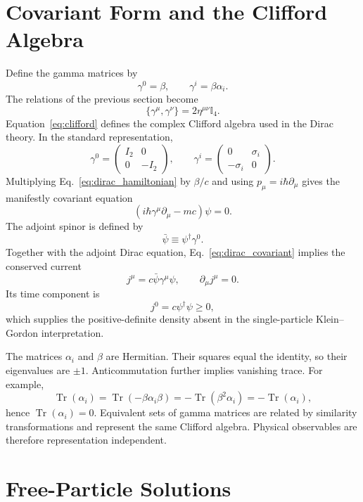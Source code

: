 \documentclass[12pt]{article}
\newcommand{\be}{\begin{equation}}
\newcommand{\ee}{\end{equation}}
\newcommand{\I}{\mathbb{I}}
\newcommand{\tr}{\operatorname{Tr}}
\numberwithin{equation}{section}
\begin{document}
\section{Covariant Form and the Clifford Algebra}

Define the gamma matrices by
\be
 \gamma^0=\beta,
 \qquad
 \gamma^i=\beta\alpha_i.
\label{eq:gamma_definition}
\ee
The relations of the previous section become
\be
 \{\gamma^\mu,\gamma^\nu\}=2\eta^{\mu\nu}\I_4.
\label{eq:clifford}
\ee
Equation~\eqref{eq:clifford} defines the complex Clifford algebra used in the Dirac theory. In the standard representation,
\be
 \gamma^0=
 \begin{pmatrix}
 I_2&0\\
 0&-I_2
 \end{pmatrix},
 \qquad
 \gamma^i=
 \begin{pmatrix}
 0&\sigma_i\\
 -\sigma_i&0
 \end{pmatrix}.
\label{eq:gamma_standard}
\ee
Multiplying Eq.~\eqref{eq:dirac_hamiltonian} by $\beta/c$ and using $p_\mu=i\hbar\partial_\mu$ gives the manifestly covariant equation
\be
 \left(i\hbar\gamma^\mu\partial_\mu-mc\right)\psi=0.
\label{eq:dirac_covariant}
\ee
The adjoint spinor is defined by
\be
 \bar\psi\equiv\psi^\dagger\gamma^0.
\ee
Together with the adjoint Dirac equation, Eq.~\eqref{eq:dirac_covariant} implies the conserved current
\be
 j^\mu=c\bar\psi\gamma^\mu\psi,
 \qquad
 \partial_\mu j^\mu=0.
\label{eq:dirac_current}
\ee
Its time component is
\be
 j^0=c\psi^\dagger\psi\geq 0,
\label{eq:positive_density}
\ee
which supplies the positive-definite density absent in the single-particle Klein--Gordon interpretation.

The matrices $\alpha_i$ and $\beta$ are Hermitian. Their squares equal the identity, so their eigenvalues are $\pm1$. Anticommutation further implies vanishing trace. For example,
\be
 \tr(\alpha_i)=\tr(-\beta\alpha_i\beta)
 =-\tr(\beta^2\alpha_i)
 =-\tr(\alpha_i),
\ee
hence $\tr(\alpha_i)=0$. Equivalent sets of gamma matrices are related by similarity transformations and represent the same Clifford algebra. Physical observables are therefore representation independent.

\section{Free-Particle Solutions}
\end{document}
